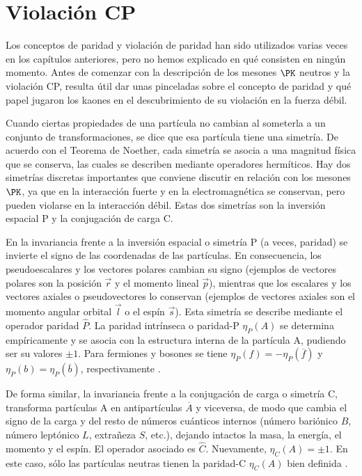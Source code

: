 \chapter{Violación CP}\label{cap:CP_violation}
Los conceptos de paridad y violación de paridad han sido utilizados varias veces en los capítulos anteriores, pero no hemos explicado en qué consisten en ningún momento. Antes de comenzar con la descripción de los mesones $\PK$ neutros y la violación CP, resulta útil dar unas pinceladas sobre el concepto de paridad y qué papel jugaron los kaones en el descubrimiento de su violación en la fuerza débil. 

Cuando ciertas propiedades de una partícula no cambian al someterla a un conjunto de transformaciones, se dice que esa partícula tiene una simetría. De acuerdo con el Teorema de Noether, cada simetría se asocia a una magnitud física que se conserva, las cuales se describen mediante operadores hermíticos. Hay dos simetrías discretas importantes que conviene discutir en relación con los mesones $\PK$, ya que en la interacción fuerte y en la
electromagnética se conservan, pero pueden violarse en la interacción débil. Estas dos simetrías son la inversión espacial P y la conjugación de carga C.

En la invariancia frente a la inversión espacial o simetría P (a veces, paridad) se invierte el signo de las coordenadas de las partículas. En consecuencia, los pseudoescalares y los vectores polares cambian su signo (ejemplos de vectores polares son la posición $\vec{r}$ y el momento lineal $\vec{p}$), mientras que los escalares y los vectores axiales o pseudovectores lo conservan (ejemplos de vectores axiales son el momento angular orbital $\vec{l}$ o el espín $\vec{s}$). Esta simetría se describe mediante el operador paridad $\hat{P}$. La paridad intrínseca o paridad-P $\eta _{P}\left(A \right)$ se determina empíricamente y se asocia con la estructura interna de la partícula A, pudiendo ser su valores $\pm 1$. Para fermiones y bosones se tiene $\eta _{P}\left(f \right)= -\eta_{P} \left(\overline{f} \right)$ y $\eta_{P}\left(b \right)=\eta_{P}\left(\overline{b}\right)$, respectivamente \cite{notas2020}. 

De forma similar, la invariancia frente a la conjugación de carga o simetría C, transforma partículas A en antipartículas $\overline{A}$ y viceversa, de modo que cambia el signo de la carga y del resto de números cuánticos internos (número bariónico $B$, número leptónico $L$, extrañeza $S$, etc.), dejando intactos la masa, la energía, el momento y el espín.  El operador asociado es $\hat{C}$. Nuevamente, $\eta _{C}\left(A\right)= \pm 1$. En este caso, sólo las partículas neutras tienen la paridad-C  $\eta _{C}\left(A \right)$ bien definida \cite{notas2020}. 


